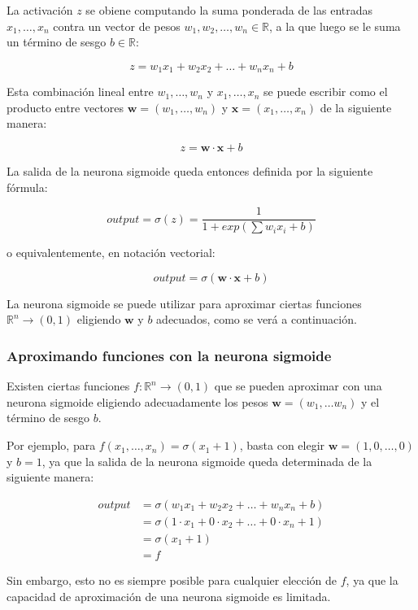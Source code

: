 \documentclass[a4paper, 10pt, twoside]{article}
\begin{document}
La activación $z$ se obiene computando la suma ponderada de las entradas $x_1,
\ldots, x_n$ contra un vector de pesos $w_1, w_2, \ldots, w_n \in \mathbb{R}$,
a la que luego se le suma un término de sesgo $b \in \mathbb{R}$:

$$z = w_1 x_1 + w_2 x_2 + \ldots + w_n x_n + b$$

Esta combinación lineal entre $w_1, \ldots, w_n$ y $x_1, \ldots, x_n$ se puede
escribir como el producto entre vectores $\bm{w} = (w_1, \ldots, w_n)$ y
$\bm{x} = (x_1, \ldots, x_n)$ de la siguiente manera:

$$z = \bm{w} \cdot \bm{x} + b$$

La salida de la neurona sigmoide queda entonces definida por la siguiente
fórmula:

$$\mathit{output} = \sigma(z) = \frac{1}{1 + exp(\sum w_i x_i + b)}$$

o equivalentemente, en notación vectorial:

$$\mathit{output} = \sigma(\bm{w} \cdot \bm{x} + b)$$

La neurona sigmoide se puede utilizar para aproximar ciertas funciones
$\mathbb{R}^n \rightarrow (0, 1)$ eligiendo $\bm{w}$ y $b$ adecuados, como se
verá a continuación.


\subsubsection{Aproximando funciones con la neurona sigmoide}

Existen ciertas funciones $f : \mathbb{R}^n \rightarrow (0, 1)$ que se pueden
aproximar con una neurona sigmoide eligiendo adecuadamente los pesos $\bm{w} =
(w_1, \ldots w_n)$ y el término de sesgo $b$.

Por ejemplo, para $f(x_1, \ldots, x_n) = \sigma(x_1 + 1)$, basta con elegir
$\bm{w} = (1, 0, \ldots, 0)$ y $b = 1$, ya que la salida de la neurona sigmoide
queda determinada de la siguiente manera:

\begin{align*}
  \mathit{output} & = \sigma(w_1 x_1 + w_2 x_2 + \ldots + w_n x_n + b) \\
                  & = \sigma(1 \cdot x_1 + 0 \cdot x_2 + \ldots + 0 \cdot x_n
                             + 1) \\
                  & = \sigma(x_1 + 1) \\
                  & = f
\end{align*}

Sin embargo, esto no es siempre posible para cualquier elección de $f$, ya que
la capacidad de aproximación de una neurona sigmoide es limitada.
\end{document}

